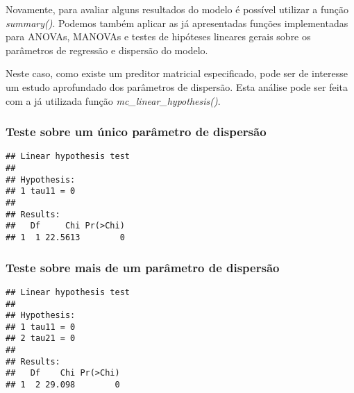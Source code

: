 Novamente, para avaliar alguns resultados do modelo é possível utilizar a função \emph{summary()}. Podemos também aplicar as já apresentadas funções implementadas para ANOVAs, MANOVAs e testes de hipóteses lineares gerais sobre os parâmetros de regressão e dispersão do modelo.

Neste caso, como existe um preditor matricial especificado, pode ser de interesse um estudo aprofundado dos parâmetros de dispersão. Esta análise pode ser feita com a já utilizada função \emph{mc\_linear\_hypothesis()}.

\subsubsection{Teste sobre um único parâmetro de dispersão}

\begin{knitrout}
\color{fgcolor}\begin{kframe}
\begin{alltt}
\hlstd{(} 
                      \hlstd{=} \hlstd{(}\hlstd{))}
\end{alltt}
\begin{verbatim}
## Linear hypothesis test
## 
## Hypothesis:           
## 1 tau11 = 0
## 
## Results:
##   Df     Chi Pr(>Chi)
## 1  1 22.5613        0
\end{verbatim}
\end{kframe}
\end{knitrout}

\subsubsection{Teste sobre mais de um parâmetro de dispersão}

\begin{knitrout}
\color{fgcolor}\begin{kframe}
\begin{alltt}
\hlstd{(} 
                      \hlstd{=} \hlstd{(}\hlstd{,}
                                    \hlstd{))}
\end{alltt}
\begin{verbatim}
## Linear hypothesis test
## 
## Hypothesis:           
## 1 tau11 = 0
## 2 tau21 = 0
## 
## Results:
##   Df    Chi Pr(>Chi)
## 1  2 29.098        0
\end{verbatim}
\end{kframe}
\end{knitrout}

